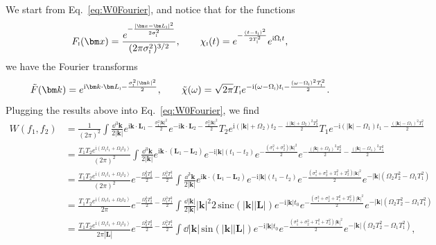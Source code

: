\documentclass[letterpaper,12pt,titlepage,oneside,final]{book}
\newcommand{\ii}{\mathrm{i}}
\newcommand{\tc}[1]{\textsc{#1}}
\begin{document}
We start from Eq.~\eqref{eq:W0Fourier}, and notice that for the functions
\begin{equation}
    F_\tc{i}(\bm x) = \frac{e^{-\frac{|\bm x - \bm L_\tc{i}|^2}{2 \sigma_\tc{i}^2}}}{(2\pi \sigma_\tc{i}^2)^{3/2}}, \quad \quad \chi_\tc{i}(t) = e^{- \frac{(t-t_\tc{i})^2}{2T_\tc{i}^2}}e^{\ii \Omega_\tc{i} t},
\end{equation}
we have the Fourier transforms
\begin{equation}
    \tilde{F}(\bm k) = e^{\ii \bm k \cdot \bm L_\tc{i} - \frac{\sigma_\tc{i}^2 |\bm k|^2}{2}}, \quad \quad \tilde{\chi}(\omega) = \sqrt{2 \pi} T_\tc{i} e^{-\ii (\omega-\Omega_\tc{i}) t_\tc{i} - \frac{(\omega-\Omega_\tc{i})^2 T_\tc{i}^2}{2}}.
\end{equation}
Plugging the results above into Eq.~\eqref{eq:W0Fourier}, we find{\footnotesize
\begin{align}
    W(f_1,f_2) &= \frac{1}{(2\pi)^2} \int \frac{\dd^3\bm k}{2 |\bm k|} e^{\ii \bm k \cdot \bm L_1 - \frac{\sigma_1^2 |\bm k|^2}{2}} e^{-\ii \bm k \cdot \bm L_2 - \frac{\sigma_2^2 |\bm k|^2}{2}} T_2 e^{\ii (|\bm k|+\Omega_2) t_2 - \frac{(|\bm k|+\Omega_2)^2 T_2^2}{2}} T_1 e^{-\ii (|\bm k|-\Omega_1) t_1 - \frac{(|\bm k|-\Omega_1)^2 T_1^2}{2}}\nonumber\\
    &= \frac{T_1T_2e^{\ii (\Omega_1 t_1+\Omega_2 t_2)}}{(2\pi)^2} \int \frac{\dd^3\bm k}{2 |\bm k|} e^{\ii \bm k \cdot (\bm L_1 - \bm L_2)} e^{-\ii |\bm k|( t_1-t_2)}e^{ - \frac{(\sigma_1^2+\sigma_2^2) |\bm k|^2}{2}}   e^{- \frac{(|\bm k|+\Omega_2)^2 T_2^2}{2} - \frac{(|\bm k|-\Omega_1)^2 T_1^2}{2}} \nonumber\\
    &= \frac{T_1T_2e^{\ii (\Omega_1 t_1+\Omega_2 t_2)}}{(2\pi)^2} e^{- \frac{\Omega_2^2 T_2^2}{2} - \frac{\Omega_1^2 T_1^2}{2}}\int \frac{\dd^3\bm k}{2 |\bm k|} e^{\ii \bm k \cdot (\bm L_1 - \bm L_2)} e^{-\ii |\bm k|( t_1-t_2)}e^{ - \frac{(\sigma_1^2+\sigma_2^2+T_1^2 + T_2^2) |\bm k|^2}{2}}    e^{- |\bm k| (\Omega_2 T_2^2-\Omega_1 T_1^2)}\nonumber
    \\
    &= \frac{T_1T_2e^{\ii (\Omega_1 t_1+\Omega_2 t_2)}}{2\pi} e^{- \frac{\Omega_2^2 T_2^2}{2} - \frac{\Omega_1^2 T_1^2}{2}}\int \frac{\dd |\bm k|}{2 |\bm k|} |\bm k|^2 2 \,\text{sinc}(|\bm k|  |\bm L|) e^{-\ii |\bm k|t_0}e^{ - \frac{(\sigma_1^2+\sigma_2^2+T_1^2 + T_2^2) |\bm k|^2}{2}}    e^{- |\bm k| (\Omega_2 T_2^2-\Omega_1 T_1^2)}\nonumber\\
    &= \frac{T_1T_2e^{\ii (\Omega_1 t_1+\Omega_2 t_2)}}{2\pi|\bm L|} e^{- \frac{\Omega_2^2 T_2^2}{2} - \frac{\Omega_1^2 T_1^2}{2}}\int \dd |\bm k|\,\text{sin}(|\bm k|  |\bm L|) e^{-\ii |\bm k|t_0}e^{ - \frac{(\sigma_1^2+\sigma_2^2+T_1^2 + T_2^2) |\bm k|^2}{2}}    e^{- |\bm k| (\Omega_2 T_2^2-\Omega_1 T_1^2)},\label{eq:WfinalInt}
\end{align}}
\end{document}

